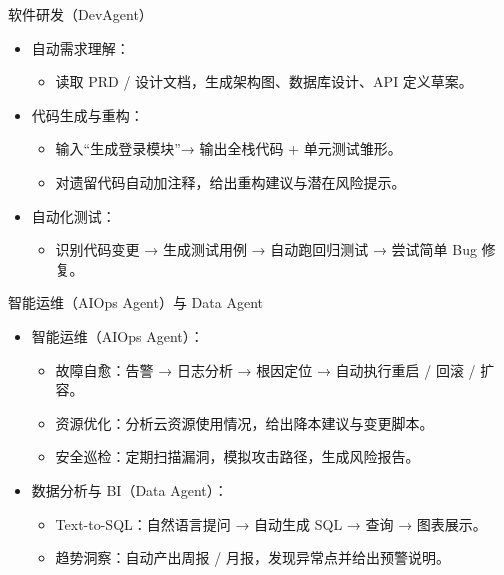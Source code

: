 \documentclass[aspectratio=169]{beamer}
\begin{document}
\begin{frame}{软件研发（DevAgent）}
  \begin{itemize}
    \item 自动需求理解：
      \begin{itemize}
        \item 读取 PRD / 设计文档，生成架构图、数据库设计、API 定义草案。
      \end{itemize}
    \item 代码生成与重构：
      \begin{itemize}
        \item 输入“生成登录模块”→ 输出全栈代码 + 单元测试雏形。
        \item 对遗留代码自动加注释，给出重构建议与潜在风险提示。
      \end{itemize}
    \item 自动化测试：
      \begin{itemize}
        \item 识别代码变更 → 生成测试用例 → 自动跑回归测试 → 尝试简单 Bug 修复。
      \end{itemize}
  \end{itemize}
\end{frame}

\begin{frame}{智能运维（AIOps Agent）与 Data Agent}
  \begin{itemize}
    \item 智能运维（AIOps Agent）：
      \begin{itemize}
        \item 故障自愈：告警 → 日志分析 → 根因定位 → 自动执行重启 / 回滚 / 扩容。
        \item 资源优化：分析云资源使用情况，给出降本建议与变更脚本。
        \item 安全巡检：定期扫描漏洞，模拟攻击路径，生成风险报告。
      \end{itemize}
    \item 数据分析与 BI（Data Agent）：
      \begin{itemize}
        \item Text-to-SQL：自然语言提问 → 自动生成 SQL → 查询 → 图表展示。
        \item 趋势洞察：自动产出周报 / 月报，发现异常点并给出预警说明。
      \end{itemize}
  \end{itemize}
\end{frame}
\end{document}
